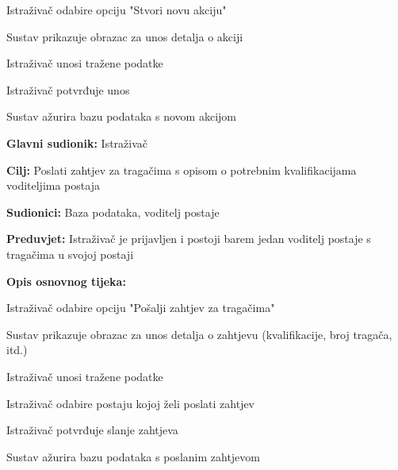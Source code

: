 \begin{packed_item}
\begin{packed_item}
\begin{packed_item}
						\item[] \begin{packed_enum}
							
							\item Istraživač odabire opciju "Stvori novu akciju" 
							\item Sustav prikazuje obrazac za unos detalja o akciji 
							\item Istraživač unosi tražene podatke 
							\item Istraživač potvrđuje unos 
							\item Sustav ažurira bazu podataka s novom akcijom 
						\end{packed_enum}
					\end{packed_item}
					
					\noindent {}
					\begin{packed_item}
						
						\item \textbf{Glavni sudionik:} Istraživač
						\item \textbf{Cilj:} Poslati zahtjev za tragačima s opisom o potrebnim kvalifikacijama voditeljima postaja
						\item \textbf{Sudionici:} Baza podataka, voditelj postaje
						\item \textbf{Preduvjet:} Istraživač je prijavljen i postoji barem jedan voditelj postaje s tragačima u svojoj postaji
						\item \textbf{Opis osnovnog tijeka:}
						
						\item[] \begin{packed_enum}
							
							\item Istraživač odabire opciju "Pošalji zahtjev za tragačima" 
							\item Sustav prikazuje obrazac za unos detalja o zahtjevu (kvalifikacije, broj tragača, itd.) 
							\item Istraživač unosi tražene podatke 
							\item Istraživač odabire postaju kojoj želi poslati zahtjev
							\item Istraživač potvrđuje slanje zahtjeva
							\item Sustav ažurira bazu podataka s poslanim zahtjevom
						\end{packed_enum}
					\end{packed_item}
					

\end{packed_item}
\end{packed_item}
